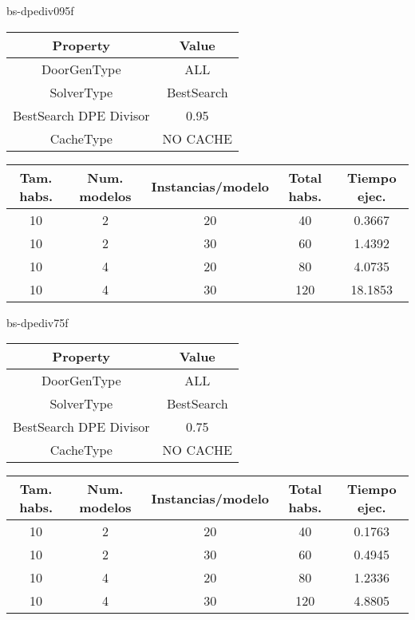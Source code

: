 bs-dpediv095f
\begin{center}
	\begin{tabular}{ | c | c | }
\hline
 		Property & Value \\ \hline
DoorGenType & ALL \\ 
SolverType & BestSearch \\ 
BestSearch DPE Divisor & 0.95 \\ 
CacheType & NO CACHE \\ 
\hline
	\end{tabular}
\end{center}

\begin{center}
	\begin{tabular}{ | c | c | c | c | c | }
\hline
Tam. habs. & Num. modelos & Instancias/modelo & Total habs. & Tiempo ejec. \\ \hline 
10 & 2 & 20 & 40 & 0.3667 \\ 
10 & 2 & 30 & 60 & 1.4392 \\ 
10 & 4 & 20 & 80 & 4.0735 \\ 
10 & 4 & 30 & 120 & 18.1853 \\ 
\hline
	\end{tabular}
\end{center}

bs-dpediv75f
\begin{center}
	\begin{tabular}{ | c | c | }
\hline
 		Property & Value \\ \hline
DoorGenType & ALL \\ 
SolverType & BestSearch \\ 
BestSearch DPE Divisor & 0.75 \\ 
CacheType & NO CACHE \\ 
\hline
	\end{tabular}
\end{center}

\begin{center}
	\begin{tabular}{ | c | c | c | c | c | }
\hline
Tam. habs. & Num. modelos & Instancias/modelo & Total habs. & Tiempo ejec. \\ \hline 
10 & 2 & 20 & 40 & 0.1763 \\ 
10 & 2 & 30 & 60 & 0.4945 \\ 
10 & 4 & 20 & 80 & 1.2336 \\ 
10 & 4 & 30 & 120 & 4.8805 \\ 
\hline
	\end{tabular}
\end{center}

